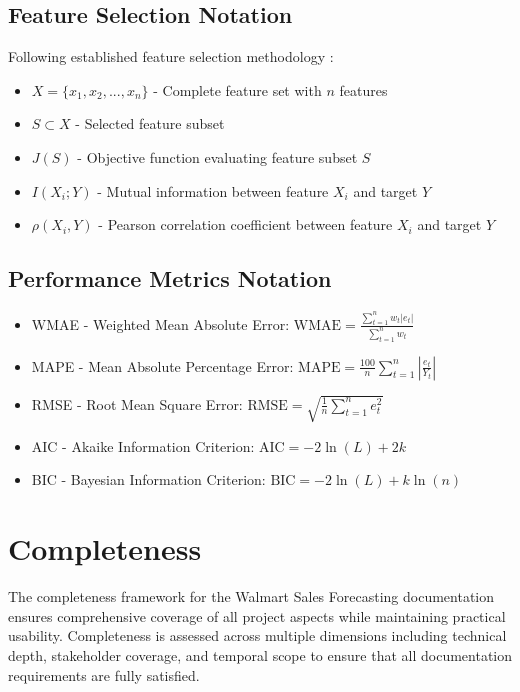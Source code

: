 		\subsection{Feature Selection Notation}
		Following established feature selection methodology \cite{Guyon:2003}:
		\begin{itemize}
			\item $X = \{x_1, x_2, ..., x_n\}$ - Complete feature set with $n$ features
			\item $S \subset X$ - Selected feature subset
			\item $J(S)$ - Objective function evaluating feature subset $S$
			\item $I(X_i; Y)$ - Mutual information between feature $X_i$ and target $Y$
			\item $\rho(X_i, Y)$ - Pearson correlation coefficient between feature $X_i$ and target $Y$
		\end{itemize}
		
		\subsection{Performance Metrics Notation}
		\begin{itemize}
			\item WMAE - Weighted Mean Absolute Error: $\text{WMAE} = \frac{\sum_{t=1}^n w_t |e_t|}{\sum_{t=1}^n w_t}$
			\item MAPE - Mean Absolute Percentage Error: $\text{MAPE} = \frac{100}{n} \sum_{t=1}^n \left|\frac{e_t}{Y_t}\right|$
			\item RMSE - Root Mean Square Error: $\text{RMSE} = \sqrt{\frac{1}{n} \sum_{t=1}^n e_t^2}$
			\item AIC - Akaike Information Criterion: $\text{AIC} = -2\ln(L) + 2k$
			\item BIC - Bayesian Information Criterion: $\text{BIC} = -2\ln(L) + k\ln(n)$
		\end{itemize}
		
		\section{Completeness}
		
		The completeness framework for the Walmart Sales Forecasting documentation ensures comprehensive coverage of all project aspects while maintaining practical usability. Completeness is assessed across multiple dimensions including technical depth, stakeholder coverage, and temporal scope to ensure that all documentation requirements are fully satisfied.
		
